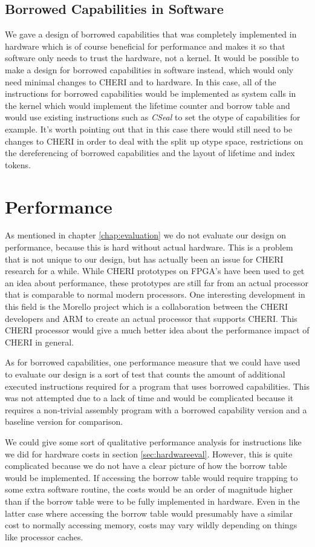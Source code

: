 \subsection{Borrowed Capabilities in Software}
We gave a design of borrowed capabilities that was completely implemented in hardware which is of course beneficial for performance and makes it so that software only needs to trust the hardware, not a kernel.
It would be possible to make a design for borrowed capabilities in software instead, which would only need minimal changes to CHERI and to hardware.
In this case, all of the instructions for borrowed capabilities would be implemented as system calls in the kernel which would implement the lifetime counter and borrow table and would use existing instructions such as \textit{CSeal} to set the otype of capabilities for example.
It's worth pointing out that in this case there would still need to be changes to CHERI in order to deal with the split up otype space, restrictions on the dereferencing of borrowed capabilities and the layout of lifetime and index tokens.

\section{Performance}
As mentioned in chapter \ref{chap:evaluation} we do not evaluate our design on performance, because this is hard without actual hardware.
This is a problem that is not unique to our design, but has actually been an issue for CHERI research for a while.
While CHERI prototypes on FPGA's have been used to get an idea about performance, these prototypes are still far from an actual processor that is comparable to normal modern processors.
One interesting development in this field is the Morello project \cite{morello} which is a collaboration between the CHERI developers and ARM to create an actual processor that supports CHERI.
This CHERI processor would give a much better idea about the performance impact of CHERI in general.

As for borrowed capabilities, one performance measure that we could have used to evaluate our design is a sort of test that counts the amount of additional executed instructions required for a program that uses borrowed capabilities.
This was not attempted due to a lack of time and would be complicated because it requires a non-trivial assembly program with a borrowed capability version and a baseline version for comparison.

We could give some sort of qualitative performance analysis for instructions like we did for hardware costs in section \ref{sec:hardwareeval}.
However, this is quite complicated because we do not have a clear picture of how the borrow table would be implemented.
If accessing the borrow table would require trapping to some extra software routine, the costs would be an order of magnitude higher than if the borrow table were to be fully implemented in hardware.
Even in the latter case where accessing the borrow table would presumably have a similar cost to normally accessing memory, costs may vary wildly depending on things like processor caches.

